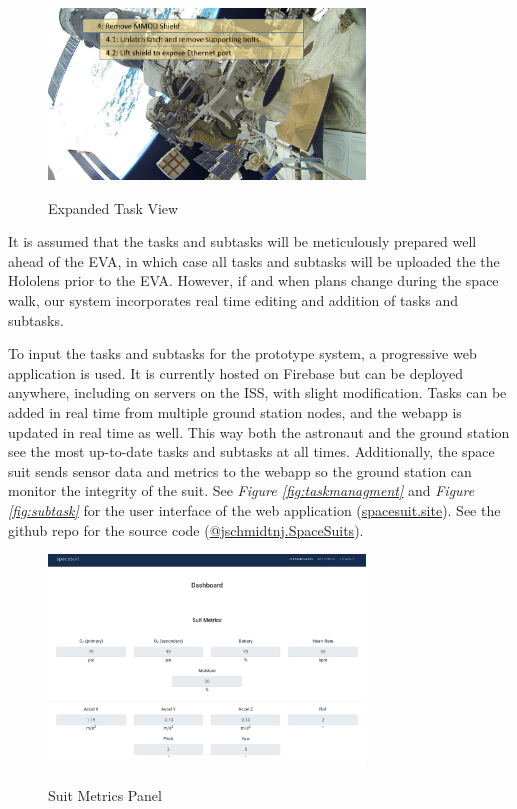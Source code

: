 \documentclass{article}
\begin{document}
\begin{figure}[!htb]
  \centering
  \caption{Expanded Task View}
  \includegraphics[width=0.75\textwidth]{assets/moresubtasks.png}
  \label{fig:moresubtasks}
\end{figure}

It is assumed that the tasks and subtasks will be meticulously prepared well ahead of the EVA, in which case all tasks and subtasks will be uploaded the the Hololens prior to the EVA. However, if and when plans change during the space walk, our system incorporates real time editing and addition of tasks and subtasks.

To input the tasks and subtasks for the prototype system, a progressive web application is used. It is currently hosted on Firebase but can be deployed anywhere, including on servers on the ISS, with slight modification. Tasks can be added in real time from multiple ground station nodes, and the webapp is updated in real time as well. This way both the astronaut and the ground station see the most up-to-date tasks and subtasks at all times. Additionally, the space suit sends sensor data and metrics to the webapp so the ground station can monitor the integrity of the suit. See \textit{Figure \ref{fig:taskmanagment}} and \textit{Figure \ref{fig:subtask}} for the user interface of the web application (\href{https://spacesuit.site}{spacesuit.site}). See the github repo for the source code (\href{https://github.com/jschmidtnj/spacesuits}{@jschmidtnj.SpaceSuits}).

\begin{figure}[!htb]
  \centering
  \caption{Suit Metrics Panel}
  \includegraphics[width=0.75\textwidth]{assets/groundcontrolsuitmetrics.png}
  \label{fig:groundcontrolsuitmetrics}
\end{figure}
\end{document}
